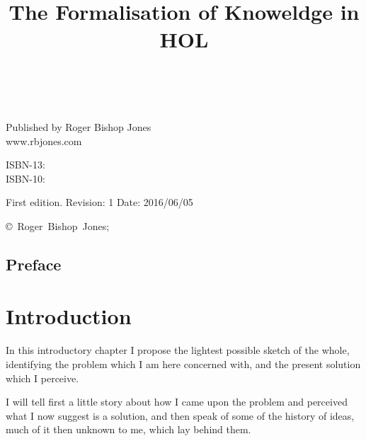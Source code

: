 \documentclass[10pt,titlepage]{book}
\title{The Formalisation of Knoweldge in HOL}
\date{\ }
\begin{document}
\frontmatter
                               
\begin{titlepage}
\maketitle

\hspace{2in}

\vfill

\begin{centering}

Published by Roger Bishop Jones\\
www.rbjones.com\\
\vspace{0.2in}

ISBN-13: \\
ISBN-10: 

\vspace{0.2in}

{\footnotesize

First edition. Revision: 1 Date: 2016/06/05

\vspace{0.2in}

\copyright\ Roger~Bishop~Jones;

}%

\end{centering}


\thispagestyle{empty}
\end{titlepage}

\setcounter{tocdepth}{2}
{\parskip-0pt\tableofcontents}
\listoffigures

\mainmatter


\section*{Preface}

\chapter{Introduction}

In this introductory chapter I propose the lightest possible sketch of the whole, identifying the problem which I am here concerned with, and the present solution which I perceive.

I will tell first a little story about how I came upon the problem and perceived what I now suggest is a solution, and then speak of some of the history of ideas, much of it then unknown to me, which lay behind them.
\end{document}
